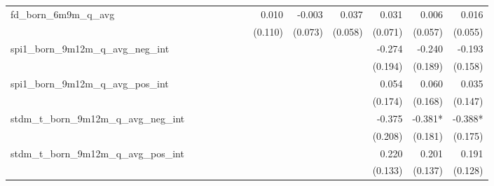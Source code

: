 \begin{tabular}{lrrrrrrrrrrrr}
fd\_born\_6m9m\_q\_avg                      &              &              &              &              &              &              &        0.010 &       -0.003 &        0.037 &        0.031 &        0.006 &        0.016 \\ 
                                            &              &              &              &              &              &              &      (0.110) &      (0.073) &      (0.058) &      (0.071) &      (0.057) &      (0.055) \\ 
spi1\_born\_9m12m\_q\_avg\_neg\_int         &              &              &              &              &              &              &              &              &              &       -0.274 &       -0.240 &       -0.193 \\ 
                                            &              &              &              &              &              &              &              &              &              &      (0.194) &      (0.189) &      (0.158) \\ 
spi1\_born\_9m12m\_q\_avg\_pos\_int         &              &              &              &              &              &              &              &              &              &        0.054 &        0.060 &        0.035 \\ 
                                            &              &              &              &              &              &              &              &              &              &      (0.174) &      (0.168) &      (0.147) \\ 
stdm\_t\_born\_9m12m\_q\_avg\_neg\_int      &              &              &              &              &              &              &              &              &              &       -0.375 &      -0.381* &      -0.388* \\ 
                                            &              &              &              &              &              &              &              &              &              &      (0.208) &      (0.181) &      (0.175) \\ 
stdm\_t\_born\_9m12m\_q\_avg\_pos\_int      &              &              &              &              &              &              &              &              &              &        0.220 &        0.201 &        0.191 \\ 
                                            &              &              &              &              &              &              &              &              &              &      (0.133) &      (0.137) &      (0.128) \\ 

\end{tabular}
